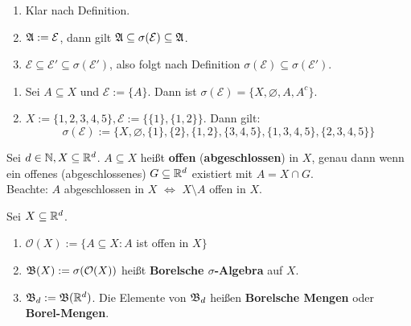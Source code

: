 \documentclass[a4paper,twoside,DIV15,BCOR12mm,chapterprefix=true,headings=onelinechapter]{scrbook}
\begin{document}
\begin{beweis}
\begin{enumerate}
\item Klar nach Definition.
\item $\mathfrak{A}:=\mathcal{E}$, dann gilt $\mathfrak{A}\subseteq\sigma(\mathcal{E})\subseteq\mathfrak{A}$.
\item $\mathcal{E}\subseteq\mathcal{E}'\subseteq\sigma(\mathcal{E}')$, also folgt nach Definition $\sigma(\mathcal{E})\subseteq\sigma(\mathcal{E}')$.
\end{enumerate}
\end{beweis}

\begin{beispiel}
\begin{enumerate}
\item Sei $A\subseteq X$ und $\mathcal{E}:=\{A\}$. Dann ist $\sigma(\mathcal{E})=\{X,\varnothing,A,A^c\}$.
\item $X:=\{1,2,3,4,5\}, \mathcal{E}:=\{\{1\},\{1,2\}\}$. Dann gilt:
\[\sigma(\mathcal{E}):=\{X,\varnothing, \{1\},\{2\},\{1,2\},\{3,4,5\},\{1,3,4,5\},\{2,3,4,5\}\}\]
\end{enumerate}
\end{beispiel}

\begin{erinnerung}
Sei $d\in\mathbb{N}, X\subseteq\mathbb{R}^d$. $A\subseteq X$ heißt \textbf{offen} (\textbf{abgeschlossen}) in $X$, genau dann wenn ein offenes (abgeschlossenes) $G\subseteq\mathbb{R}^d$ existiert mit $A=X\cap G$.\\
Beachte: $A$ abgeschlossen in $X$ $\iff$ $X\setminus A$ offen in $X$.
\end{erinnerung}

\begin{definition}
Sei $X\subseteq\mathbb{R}^d$.
\begin{enumerate}
\item $\mathcal{O}(X):=\{A\subseteq X:A$ ist offen in $X\}$
\item $\mathfrak{B}(X):=\sigma(\mathcal{O}(X))$ heißt \textbf{Borelsche $\sigma$-Algebra} auf $X$.
\item $\mathfrak{B}_d:=\mathfrak{B}(\mathbb{R}^d)$. Die Elemente von $\mathfrak{B}_d$ heißen \textbf{Borelsche Mengen} oder \textbf{Borel-Mengen}.
\end{enumerate}
\end{definition}
\end{document}

